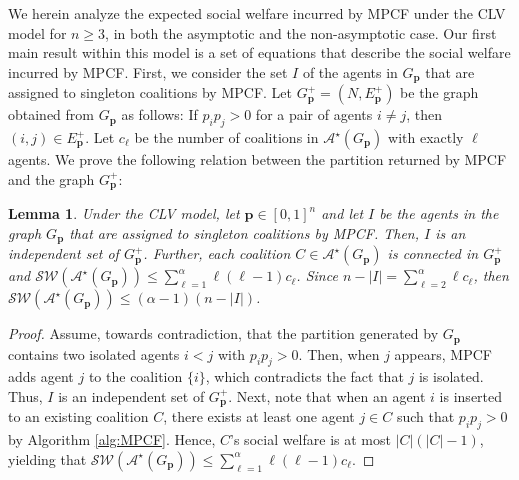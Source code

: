 \documentclass[letterpaper]{article} %
\newtheorem{lemma}{Lemma}
\begin{document}
We herein analyze the expected social welfare incurred by MPCF under the CLV model for $n \geq 3$, in both the asymptotic and the non-asymptotic case. %
%
Our first main result within this model is a set of equations that describe the social welfare incurred by MPCF. First, we consider the set $I$ of the agents in $G_{\mathbf{p}}$ that are assigned to singleton coalitions by MPCF. Let $G^+_{\mathbf{p}} = (N, E_{\mathbf{p}}^+)$ be the graph obtained from $G_{\mathbf{p}}$ as follows: If $p_i p_j > 0$ for a pair of agents $i\neq j$, then $(i,j) \in E_{\mathbf{p}}^+$. Let $c_\ell$ be the number of coalitions in $\mathcal{A}^\star(G_\mathbf{p})$ with exactly $\ell$ agents. We prove the following relation between the partition returned by MPCF and the graph $G^+_{\mathbf{p}}$:
\begin{lemma}
    \label{lemma:isolated}
    Under the CLV model, let $\mathbf{p} \in [0,1]^n$ and let $I$ be the agents in the graph $G_{\mathbf{p}}$ that are assigned to singleton coalitions by MPCF. Then, $I$ is an independent set of $G^+_{\mathbf{p}}$. Further, each coalition $C \in \mathcal{A}^\star(G_\mathbf{p})$ is connected in $G^+_{\mathbf{p}}$ and $\mathcal{SW}(\mathcal{A}^\star(G_\mathbf{p})) \leq \sum_{\ell=1}^\alpha \ell(\ell-1) c_\ell$. Since $n - |I| = \sum_{\ell=2}^\alpha \ell c_\ell$, then $\mathcal{SW}(\mathcal{A}^\star(G_\mathbf{p})) \leq (\alpha-1) (n-|I|)$.
\end{lemma}
\begin{proof}
    Assume, towards contradiction, that the partition generated by $G_{\mathbf{p}}$ contains two isolated agents $i<j$ with $p_i p_j > 0$. Then, when $j$ appears, MPCF adds agent $j$ to the coalition $\{i\}$, which contradicts the fact that $j$ is isolated. Thus, $I$ is an independent set of $G^+_{\mathbf{p}}$. Next, note that when an agent $i$ is inserted to an existing coalition $C$, there exists at least one agent $j \in C$ such that $p_i p_j > 0$ by Algorithm \ref{alg:MPCF}. Hence, $C$'s social welfare is at most $|C|(|C|-1)$, yielding that $\mathcal{SW}(\mathcal{A}^\star(G_\mathbf{p})) \leq \sum_{\ell=1}^\alpha \ell(\ell-1) c_\ell$.
\end{proof}
\end{document}

